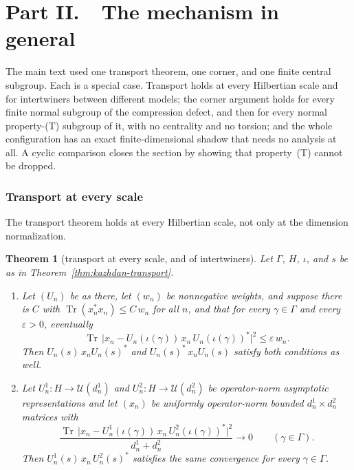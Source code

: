 \documentclass[11pt]{amsart}
\newcommand{\leanverified}[2]{\ignorespaces}
\newtheorem{theorem}{Theorem}[section]
\theoremstyle{definition}
\theoremstyle{remark}
\theoremstyle{plain}
\newcommand{\U}{\mathcal U}
\begin{document}
\clearpage
\part*{Part II.\ \ The mechanism in general}

\noindent
The main text used one transport theorem, one corner, and one finite central
subgroup.  Each is a special case.  Transport holds at every Hilbertian scale
and for intertwiners between different models; the corner argument holds for
every finite normal subgroup of the compression defect, and then for every
normal property-\textup{(T)} subgroup of it, with no centrality and no torsion;
and the whole configuration has an exact finite-dimensional shadow that needs
no analysis at all.  A cyclic comparison closes the section by showing that
property~\textup{(T)} cannot be dropped.

\section{Transport at every scale}\label{supp:transport-variants}

The transport theorem holds at every Hilbertian scale, not only at the
dimension normalization.

\begin{theorem}[transport at every scale, and of intertwiners]
\label{thm:transport-variants}
Let $\Gamma$, $H$, $\iota$, and $s$ be as in
Theorem~\ref{thm:kazhdan-transport}.
\begin{enumerate}
\item Let $(U_n)$ be as there, let $(w_n)$ be nonnegative weights,
and suppose there is $C$ with
$\operatorname{Tr}(x_n^*x_n)\le C\,w_n$ for all $n$, and that for
every $\gamma\in\Gamma$ and every $\varepsilon>0$, eventually
\[
 \operatorname{Tr}\,\bigl|x_n-U_n(\iota(\gamma))\,x_n\,
   U_n(\iota(\gamma))^*\bigr|^2\le\varepsilon\,w_n.
\]
Then $U_n(s)\,x_nU_n(s)^*$ and $U_n(s)^*\,x_nU_n(s)$ satisfy both
conditions as well.
\item Let $U^1_n\colon H\to\U(d^1_n)$ and
$U^2_n\colon H\to\U(d^2_n)$ be operator-norm asymptotic
representations and let $(x_n)$ be uniformly operator-norm bounded
$d^1_n\times d^2_n$ matrices with
\[
 \frac{\operatorname{Tr}\,\bigl|x_n-U^1_n(\iota(\gamma))\,x_n\,
   U^2_n(\iota(\gamma))^*\bigr|^2}{d^1_n+d^2_n}\longrightarrow0
 \qquad(\gamma\in\Gamma).
\]
Then $U^1_n(s)\,x_n\,U^2_n(s)^*$ satisfies the same convergence for
every $\gamma\in\Gamma$.
\leanverified{Sofic/ScaledKazhdanTransport}{GroupApproximation.ScaledKazhdanTransport.scaled_transport_both}
\leanverified{Sofic/IntertwinerKazhdanTransport}{GroupApproximation.IntertwinerKazhdanTransport.manuscriptIntertwinerTransport}
\leanverified{Sofic/IntertwinerKazhdanTransport}{GroupApproximation.IntertwinerKazhdanTransport.scaled_intertwiner_transport}
\end{enumerate}
\end{theorem}
\end{document}
